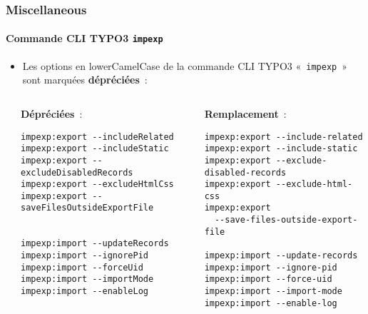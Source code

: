 %

\begin{frame}[fragile]
	\frametitle{Miscellaneous}
	\framesubtitle{Commande CLI TYPO3 \texttt{impexp}}


	\begin{itemize}
		\item Les options en lowerCamelCase de la commande CLI TYPO3
			«~\texttt{impexp}~» sont marquées \textbf{dépréciées}~:
	\end{itemize}

	\begin{columns}[T]
		\begin{column}{.06\textwidth}
		\end{column}
		\begin{column}{.47\textwidth}
			\smaller\textbf{Dépréciées}~:\normalsize
\begin{lstlisting}
impexp:export --includeRelated
impexp:export --includeStatic
impexp:export --excludeDisabledRecords
impexp:export --excludeHtmlCss
impexp:export --saveFilesOutsideExportFile


impexp:import --updateRecords
impexp:import --ignorePid
impexp:import --forceUid
impexp:import --importMode
impexp:import --enableLog
\end{lstlisting}
		\end{column}
		\begin{column}{.47\textwidth}
			\smaller\textbf{Remplacement}~:\normalsize
\begin{lstlisting}
impexp:export --include-related
impexp:export --include-static
impexp:export --exclude-disabled-records
impexp:export --exclude-html-css
impexp:export
  --save-files-outside-export-file

impexp:import --update-records
impexp:import --ignore-pid
impexp:import --force-uid
impexp:import --import-mode
impexp:import --enable-log
\end{lstlisting}
		\end{column}
	\end{columns}

\end{frame}

